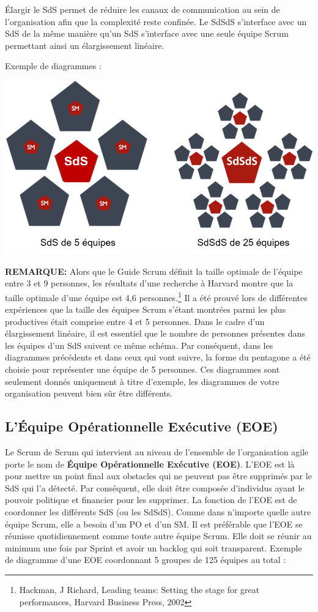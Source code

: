 \documentclass[12pt,a4paper,parskip=full]{scrartcl}
\begin{document}
Élargir le SdS permet de réduire les canaux de communication au sein de l’organisation
afin que la complexité reste confinée. Le SdSdS s’interface avec un SdS de la même
manière qu’un SdS s’interface avec une seule équipe Scrum permettant ainsi un
élargissement linéaire.

\pagebreak
Exemple de diagrammes :

\includegraphics[width=1.0\linewidth]{Sds-R2.png}

\textbf{\textsc{REMARQUE:}} Alors que le Guide Scrum définit la taille optimale de l’équipe entre 3 et 9
personnes, les résultats d’une recherche à Harvard montre que la taille optimale d’une
équipe est 4,6 personnes.\footnote{Hackman, J Richard, Leading teams: Setting the stage for
great performances, Harvard Business Press, 2002} Il a été prouvé lors de différentes expériences que la taille des
équipes Scrum s’étant montrées parmi les plus productives était comprise entre 4 et 5
personnes. Dans le cadre d’un élargissement linéaire, il est essentiel que le nombre de
personnes présentes dans les équipes d’un SdS suivent ce même schéma. Par
conséquent, dans les diagrammes précédents et dans ceux qui vont suivre, la forme du
pentagone a été choisie pour représenter une équipe de 5 personnes. Ces diagrammes
sont seulement donnés uniquement à titre d’exemple, les diagrammes de votre
organisation peuvent bien sûr être différents.

\subsection{L’Équipe Opérationnelle Exécutive (EOE)}
Le Scrum de Scrum qui intervient au niveau de l’ensemble de l’organisation agile porte le
nom de \textbf{Équipe Opérationnelle Exécutive (EOE)}. L’EOE est là pour mettre un point final
aux obstacles qui ne peuvent pas être supprimés par le SdS qui l’a détecté. Par
conséquent, elle doit être composée d’individus ayant le pouvoir politique et financier pour
les supprimer. La fonction de l’EOE est de coordonner les différents SdS (ou les SdSdS).
Comme dans n’importe quelle autre équipe Scrum, elle a besoin d’un PO et d’un SM. Il est
préférable que l’EOE se réunisse quotidiennement comme toute autre équipe Scrum. Elle
doit se réunir au minimum une fois par Sprint et avoir un backlog qui soit transparent.
Exemple de diagramme d’une EOE coordonnant 5 groupes de 125 équipes au total :
\end{document}
